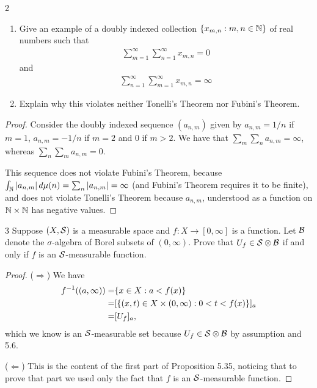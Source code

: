 \begin{exercise}{2}
\begin{enumerate}
    \item Give an example of a doubly indexed collection $\{x_{m, n}: m, n \in \mathbb{N}\}$ of real numbers such that
    \begin{align*}
        \sum_{m=1}^\infty \sum_{n=1}^\infty x_{m,n} = 0
    \end{align*}
    and
    \begin{align*}
        \sum_{n=1}^\infty \sum_{m=1}^\infty x_{m,n} = \infty
    \end{align*}
    \item Explain why this violates neither Tonelli's Theorem nor Fubini's Theorem.
\end{enumerate}
\end{exercise}
\begin{proof}
Consider the doubly indexed sequence $(a_{n,m})$ given by $a_{n,m} = 1/n$ if $m=1$, $a_{n,m} = -1/n$ if $m=2$ and $0$ if $m > 2$.
We have that $\sum_m \sum_n a_{n,m} = \infty$, whereas $\sum_n \sum_m a_{n,m} = 0$.

This sequence does not violate Fubini's Theorem, because $\int_{\mathbb{N}} \left\lvert a_{n,m}\right\rvert d\mu(n) = \sum_n \left\lvert a_{n,m}\right\rvert = \infty$ (and Fubini's Theorem requires it to be finite), and does not violate Tonelli's Theorem because $a_{n,m}$, understood as a function on $\mathbb{N} \times \mathbb{N}$ has negative values.
\end{proof} 

\begin{exercise}{3}
Suppose $(X, \mathcal{S})$ is a measurable space and $f: X \to [0, \infty]$ is a function.
Let $\mathcal{B}$ denote the $\sigma$-algebra of Borel subsets of $(0, \infty)$.
Prove that $U_f \in \mathcal{S} \otimes \mathcal{B}$ if and only if $f$ is an $\mathcal{S}$-measurable function.
\end{exercise}
\begin{proof}
($\Rightarrow$)
We have
\begin{align*}
    f^{-1}((a, \infty))
    =& \{x \in X: a < f(x)\}\\
    =& [ \{(x, t) \in X \times (0,\infty): 0 < t < f(x)\} ]_a\\
    =& [U_f]_a,
\end{align*}
which we know is an $\mathcal{S}$-measurable set because $U_f \in \mathcal{S} \otimes \mathcal{B}$ by assumption and 5.6.

($\Leftarrow$)
This is the content of the first part of Proposition 5.35, noticing that to prove that part we used only the fact that $f$ is an $\mathcal{S}$-measurable function.
\end{proof} 
